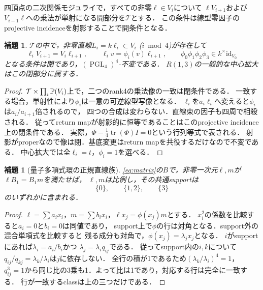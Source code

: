\documentclass[11pt,a4paper]{ltjsarticle}
\newtheorem{lemma}[theorem]{補題}
\theoremstyle{definition}\newtheorem{definition}[theorem]{定義}
\newcommand{\PGL}{\operatorname{PGL}}\newcommand{\GL}{\operatorname{GL}}
\begin{document}
四頂点の二次関係モジュライで，すべての非零$\ell\in V_i$について
$\ell V_{i+1}$および$V_{i-1}\ell$への乗法が単射になる開部分を$\mathcal T$とする．
この条件は線型零因子のprojective incidenceを射影することで開条件となる．
\begin{lemma}\label{lem:closed}
$\mathcal T$の中で，非零直線$L_i=k\ell_i\subset V_i$ ($i\bmod4$)が存在して
\[
 \ell_iV_{i+1}=V_i\ell_{i+1},\qquad
 \ell_i v=\phi_i(v)\ell_{i+1},\qquad
 \phi_0\phi_1\phi_2\phi_3\in k^\times\mathrm{id}_{V_0}
\]
となる条件は閉であり，$(\PGL_4)^4$-不変である．
$R(1,3)$の一般的な中心拡大はこの閉部分に属する．
\end{lemma}
\begin{proof}
$\mathcal T\times\prod_i\mathbb P(V_i)$上で，二つのrank4の乗法像の一致は閉条件である．
一致する場合，単射性により$\phi_i$は一意の可逆線型写像となる．
$\ell_i$を$a_i\ell_i$へ変えると$\phi_i$は$a_i/a_{i+1}$倍されるので，
四つの合成は変わらない．直線束の因子も四周で相殺される．
従ってreturn mapが射影的に恒等であることはこのprojective incidence上の閉条件である．
実際，$\Phi-\tfrac14\operatorname{tr}(\Phi)I=0$という行列等式で表される．
射影がproperなので像は閉．基底変更はreturn mapを共役するだけなので不変である．
中心拡大では全$\ell_i=t$，$\phi_i=1$を選べる．
\end{proof}

\begin{lemma}[量子多項式環の正規直線族]\label{lem:lines}
\eqref{eq:matrix}の$B$で，非零一次元$\ell,m$が$\ell B_1=B_1m$を満たせば，
$\ell,m$は比例し，その共通supportは
\[
 \{0\},\qquad\{1,2\},\qquad\{3\}
\]
のいずれかに含まれる．
\end{lemma}
\begin{proof}
$\ell=\sum a_ix_i$，$m=\sum b_ix_i$，$\ell x_j=\phi(x_j)m$とする．
$x_i^2$の係数を比較すると$a_i=0$と$b_i=0$は同値であり，
support上で$\phi$の行は対角となる．support外の混合単項式を比較すると
残る成分も対角で，$\phi(x_j)=\lambda_jx_j$となる．
$i$がsupportにあれば$\lambda_i=a_i/b_i$かつ
$\lambda_j=\lambda_iq_{ij}$である．
従ってsupport内の$i,k$について$q_{ij}/q_{kj}=\lambda_k/\lambda_i$は$j$に依存しない．
全行の積が1であるため$(\lambda_k/\lambda_i)^4=1$，
$q_{ij}^3=1$から同じ比の3乗も1．よって比は1であり，対応する行は完全に一致する．
行が一致するclassは上の三つだけである．
\end{proof}
\end{document}
